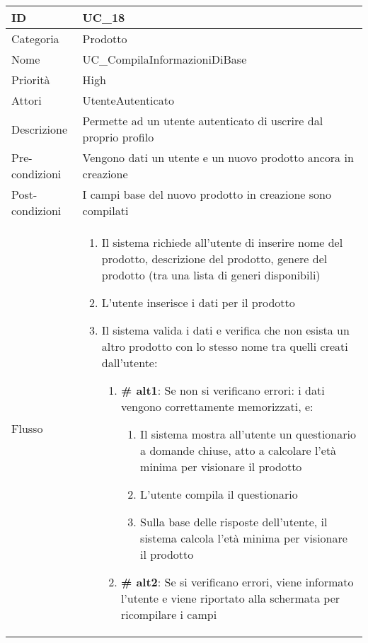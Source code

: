 \begin{center}
\begin{tabular}{ |p{2cm}|p{13cm}|  }
\hline
ID & UC\_18\\\hline
Categoria & Prodotto \\\hline
Nome & UC\_CompilaInformazioniDiBase \\\hline
Priorità & High \\\hline
Attori &  UtenteAutenticato \\\hline
Descrizione & Permette ad un utente autenticato di uscrire dal proprio profilo \\\hline
Pre-condizioni &  Vengono dati un utente e un nuovo prodotto ancora in creazione\\\hline
Post-condizioni &  I campi base del nuovo prodotto in creazione sono compilati\\\hline
Flusso &  	\begin{enumerate}
			\item Il sistema richiede all'utente di inserire nome del prodotto, descrizione del prodotto, genere del prodotto (tra una lista di generi disponibili)
			\item L'utente inserisce i dati per il prodotto
			\item Il sistema valida i dati e verifica che non esista un altro prodotto con lo stesso nome tra quelli creati dall'utente:
			\begin{enumerate}[  ]
				\item \textbf{\# alt1}: Se non si verificano errori: i dati vengono correttamente memorizzati, e:
				\begin{enumerate}[label*=\arabic*.]
					\item Il sistema mostra all'utente un questionario a domande chiuse, atto a calcolare l'età minima per visionare il prodotto
					\item L'utente compila il questionario
					\item Sulla base delle risposte dell'utente, il sistema calcola l'età minima per visionare il prodotto
				\end{enumerate}
				\item \textbf{\# alt2}: Se si verificano errori, viene informato l'utente e viene riportato alla schermata per ricompilare i campi
			\end{enumerate}
		\end{enumerate}\\\hline
\end{tabular}
\label{table_use_case:18}\newline


\end{center}
